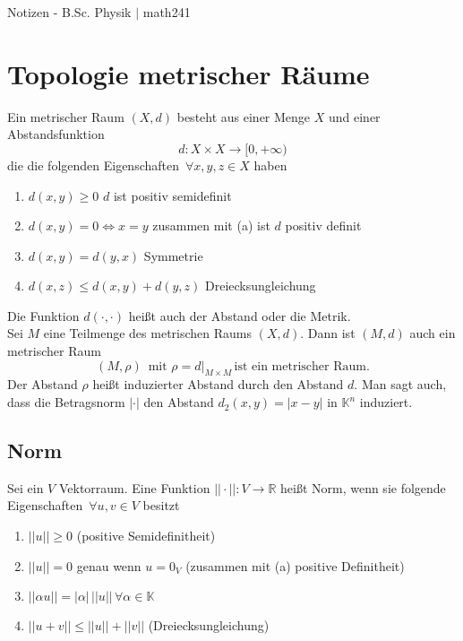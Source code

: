 \documentclass[a4paper,12pt]{article}
\begin{document}

\thispagestyle{empty}
\hfill
\Huge
\begin{center}
        Notizen - B.Sc. Physik $|$ math241
\end{center}
\normalsize
\hfill


\newpage


\tableofcontents


\newpage



\section{Topologie metrischer Räume}
Ein metrischer Raum $\left(X,d\right)$ besteht aus einer Menge $X$ und einer Abstandsfunktion 
\[ 
        d:X\times X\rightarrow [0,+\infty)
\] 
die die folgenden Eigenschaften $\,\forall x,y,z \in X$ haben
\begin{enumerate}[label=(\alph*)]
        \item $d\left(x,y\right)\geq 0$ $d$ ist positiv semidefinit
        \item $d\left(x,y\right)=0\Leftrightarrow x=y$ zusammen mit (a) ist $d$ positiv definit
        \item $d\left(x,y\right)=d\left(y,x\right)$ Symmetrie
        \item $d\left(x,z\right)\leq d\left(x,y\right)+d\left(y,z\right)$ Dreiecksungleichung
\end{enumerate}
Die Funktion $d\left(\cdot ,\cdot \right)$ heißt auch der Abstand oder die Metrik.\\\indent
Sei $M$ eine Teilmenge des metrischen Raums $\left(X,d\right)$. Dann ist $\left(M,d\right)$ auch ein metrischer Raum
\[ 
        \left(M,\rho \right)\,\text{ mit }\rho =d|_{M\times M}\,\text{ist ein metrischer Raum}
.\] 
Der Abstand $\rho $ heißt induzierter Abstand durch den Abstand $d$. Man sagt auch, dass die Betragsnorm $|\cdot |$ den Abstand $d_2\left(x,y\right)=|x-y|$ in $\mathbb{K}^n$ induziert.

\subsection{Norm}
Sei ein $V$ Vektorraum. Eine Funktion $||\cdot ||:V\rightarrow \mathbb{R}$ heißt Norm, wenn sie folgende Eigenschaften $\,\forall u,v \in V$ besitzt
\begin{enumerate}[label=(\alph*)]
        \item $||u|| \geq 0$ (positive Semidefinitheit)
        \item $||u|| =0$ genau wenn $u=0_V$ (zusammen mit (a) positive Definitheit)
        \item $||\alpha u|| =|\alpha |\,||u|| \,\forall \alpha  \in \mathbb{K}$ 
        \item $||u+v|| \leq ||u|| +||v|| $ (Dreiecksungleichung)
\end{enumerate}
\end{document}
